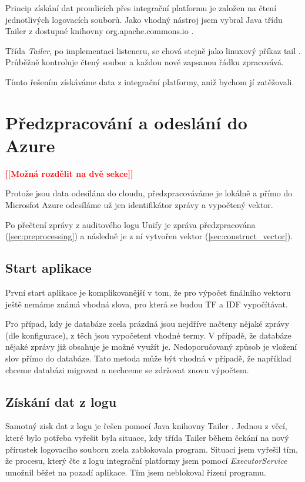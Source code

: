 \documentclass[thesis=M,czech]{FITthesis}[2012/10/20]
\newcommand{\todo}[1]{\textcolor{red}{\textbf{[[#1]]}}}
\begin{document}
		Princip získání dat proudicích přes integrační platformu je založen na čtení jednotlivých logovacích souborů. Jako vhodný nástroj jsem vybral Java třídu Tailer z dostupné knihovny org.apache.commons.io \cite{tailerClass}.
		
		Třída \textit{Tailer}, po implementaci listeneru, se chová stejně jako linuxový příkaz tail \cite{tailLinux}. Průběžně kontroluje čtený soubor a každou nově zapsanou řádku zpracovává.
		
		Tímto řešením získáváme data z integrační platformy, aniž bychom jí zatěžovali. 
		
	\section{Předzpracování a odeslání do Azure}
		\label{sec:send_to_azure}
		\todo{Možná rozdělit na dvě sekce}
		
		Protože jsou data odesílána do cloudu, předzpracováváme je lokálně a přímo do Microsfot Azure odesíláme už jen identifikátor zprávy a vypočtený vektor.
		
		Po přečtení zprávy z auditového logu Unify je zpráva předzpracována (\ref{sec:preprocessing}) a následně je z ní vytvořen vektor (\ref{sec:construct_vector}).
		
		\subsection{Start aplikace}
			První start aplikace je komplikovanější v tom, že pro výpočet finálního vektoru ještě nemáme známá vhodná slova, pro která se budou TF a IDF vypočítávat.
			
			Pro případ, kdy je databáze zcela prázdná jsou nejdříve načteny nějaké zprávy (dle konfigurace), z těch jsou vypočetent vhodné termy.
			V případě, že databáze nějaké zprávy již obsahuje je možné využít je. Nedoporučovaný způsob je vložení slov přímo do databáze. Tato metoda může být vhodná v případě, že například chceme databázi migrovat a nechceme se zdržovat znovu výpočtem.
		
		\subsection{Získání dat z logu}
		 Samotný zisk dat z logu je řešen pomocí Java knihovny Tailer \cite{javaTailer}. Jednou z věcí, které bylo potřeba vyřešit byla situace, kdy třída Tailer během čekání na nový přírustek logovacího souboru zcela zablokovala program. Situaci jsem vyřešil tím, že procesu, který čte z logu integrační platformy jsem pomocí \textit{ExecutorService} \cite{javaExecutorService} umožnil běžet na pozadí aplikace. Tím jsem neblokoval řízení programu.
		 
\end{document}
